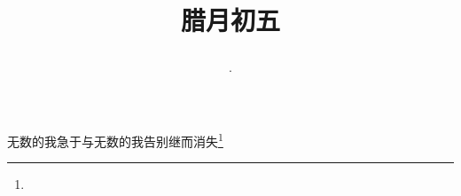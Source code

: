 \title{\date[d=15,m=1,y=2024][year:cn-y,年,month:cn,day:cn,日,·,weekday]·腊月初五 }
无数的我急于与无数的我告别继而消失\footnote{ }

